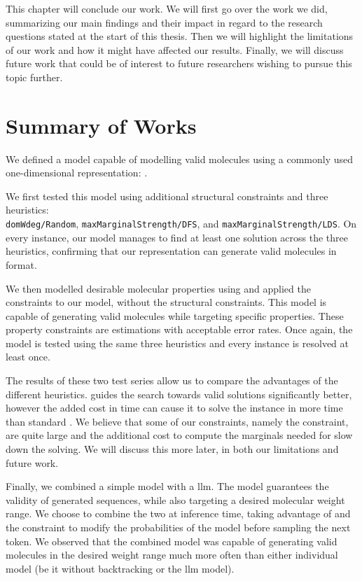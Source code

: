 \documentclass[../Document.tex]{subfiles}
\begin{document}
\label{chap:conclusion}
This chapter will conclude our work.
We will first go over the work we did, summarizing our main findings and their impact in regard to the research questions stated at the start of this thesis.
Then we will highlight the limitations of our work and how it might have affected our results.
Finally, we will discuss future work that could be of interest to future researchers wishing to pursue this topic further.

\section{Summary of Works}
\label{sec:conc/summary}
We defined a model capable of modelling valid molecules using a commonly used one-dimensional representation: \smiles.

We first tested this model using additional structural constraints and three heuristics:\\ \texttt{domWdeg/Random}, \texttt{maxMarginalStrength/DFS}, and \texttt{maxMarginalStrength/LDS}.
On every instance, our model manages to find at least one solution across the three heuristics, confirming that our representation can generate valid molecules in \smiles format.

We then modelled desirable molecular properties using \cp and applied the constraints to our model, without the structural constraints.
This model is capable of generating valid molecules while targeting specific properties.
These property constraints are estimations with acceptable error rates.
Once again, the model is tested using the same three heuristics and every instance is resolved at least once.

The results of these two test series allow us to compare the advantages of the different heuristics. \bp guides the search towards valid solutions significantly better, however the added cost in time can cause it to solve the instance in more time than standard \cp.
We believe that some of our constraints, namely the \grammar constraint, are quite large and the additional cost to compute the marginals needed for \bp slow down the solving. We will discuss this more later, in both our limitations and future work.

Finally, we combined a simple \cp model with a \gls{llm}.
The \cp model guarantees the validity of generated sequences, while also targeting a desired molecular weight range.
We choose to combine the two at inference time, taking advantage of \bp and the \oracle constraint to modify the probabilities of the model before sampling the next token.
We observed that the combined model was capable of generating valid molecules in the desired weight range much more often than either individual model (be it \cp without backtracking or the \gls{llm} model).
\end{document}
